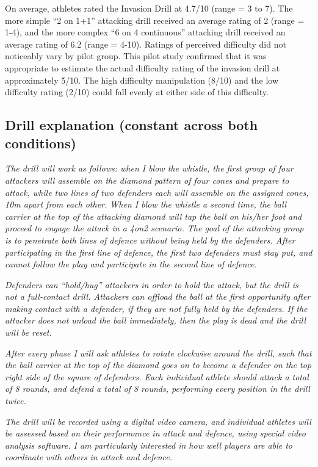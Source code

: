 \begin{CJK}{UTF8}{gbsn}
On average, athletes rated the Invasion Drill at 4.7/10 (range = 3 to 7).  The more simple ``2 on 1+1'' attacking drill received an average rating of 2 (range = 1-4), and the more complex ``6 on 4 continuous'' attacking drill received an average rating of 6.2 (range = 4-10). Ratings of perceived difficulty did not noticeably vary by pilot group. This pilot study confirmed that it was appropriate to estimate the actual difficulty rating of the invasion drill at approximately 5/10. The high difficulty manipulation (8/10) and the low difficulty rating (2/10) could fall evenly at either side of this difficulty.



\subsection{\label{app9:drillExplanation}Drill explanation (constant across both conditions)}

\textit{
The drill will work as follows:  when I blow the whistle, the first group of four attackers will assemble on the diamond pattern of four cones and prepare to attack, while two lines of two defenders each will assemble on the assigned cones, 10m apart from each other.  When I blow the whistle a second time, the ball carrier at the top of the attacking diamond will tap the ball on his/her foot and proceed to engage the attack in a 4on2 scenario.  The goal of the attacking group is to penetrate both lines of defence without being held by the defenders.  After participating in the first line of defence, the first two defenders must stay put, and cannot follow the play and participate in the second line of defence.
}

\textit{
Defenders can ``hold/hug'' attackers in order to hold the attack, but the drill is not a full-contact drill.  Attackers can offload the ball at the first opportunity after making contact with a defender, if they are not fully held by the defenders.  If the attacker does not unload the ball immediately, then the play is dead and the drill will be reset.
}


\textit{
After every phase I will ask athletes to rotate clockwise around the drill, such that the ball carrier at the top of the diamond goes on to become a defender on the top right side of the square of defenders. Each individual athlete should attack a total of 8 rounds, and defend a total of 8 rounds, performing every position in the drill twice.}

\textit{
The drill will be recorded using a digital video camera, and individual athletes will be assessed based on their performance in attack and defence, using special video analysis software. I am particularly interested in how well players are able to coordinate with others in attack and defence.
}




\end{CJK}
